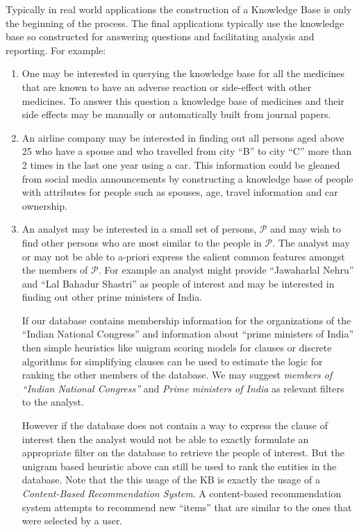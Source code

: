 \documentclass[paper=a4,fontsize=11pt]{scrartcl}
\numberwithin{equation}{section}    %
\numberwithin{figure}{section}      %
\numberwithin{table}{section}       %
\begin{document}
Typically in real world applications the construction of a Knowledge Base
is only the beginning of the process. The final applications
typically use the knowledge base so constructed for answering questions and
facilitating analysis and reporting. For example: 
\begin{enumerate}
\item One may be interested in querying the 
knowledge base for all the medicines that are known to have an adverse 
reaction or side-effect with other medicines. 
To answer this question a knowledge base of medicines and their side effects may be 
manually or automatically built from journal papers.
\item  An airline company may be interested in finding out all 
persons aged above 25 who have a spouse and who travelled from city ``B''
to city ``C'' more than 2 times in the last one year using a car.
This information could be gleaned from social media announcements by constructing a
knowledge base of people with attributes for people such as spouses, age, 
travel information and car ownership.

\item  An analyst may be interested in a small set of persons, 
  $\mathcal{P}$ and may wish to find other persons who are most similar to the people in $\mathcal{P}$. 
  The analyst may or may not be able to a-priori express the salient common features 
  amongst the members of $\mathcal{P}$. For example an analyst might provide
  ``Jawaharlal Nehru'' and ``Lal Bahadur Shastri'' as people of interest and
  may be interested in finding out other prime ministers of India.

If our database contains  membership  information for the organizations of the
``Indian National Congress'' and information about ``prime ministers of India''
then simple heuristics like unigram scoring models for clauses or
discrete algorithms for simplifying clauses
can be used to estimate the logic for ranking the other members of the database.
We may suggest \textit{members of ``Indian National Congress''} and 
\textit{Prime ministers of India} as relevant filters to the analyst.

However if the database does not contain a way to express the clause of interest
then the analyst would not be able to exactly formulate an appropriate 
filter on the database to retrieve the people of interest. 
But the unigram based heuristic above can still be 
used to rank the entities in the database. Note that the this usage of the
KB is exactly the usage of a \textit{Content-Based Recommendation System}. 
A content-based recommendation system attempts to recommend new ``items'' 
that are similar to the ones that were selected by a user.
\end{enumerate} 
\end{document}
